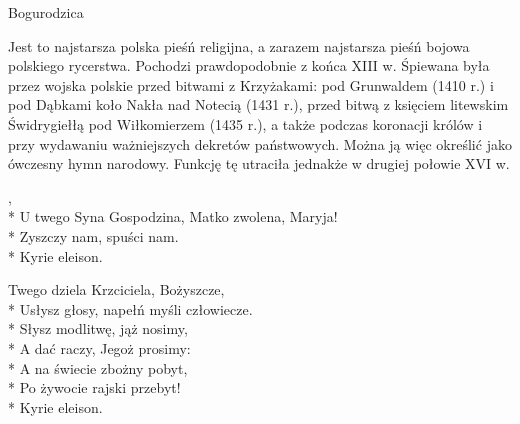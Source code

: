 \song
{Bogurodzica}
\begin{info}Jest to najstarsza polska pieśń religijna, a zarazem najstarsza pieśń bojowa polskiego rycerstwa. Pochodzi prawdopodobnie z końca XIII w. Śpiewana była przez wojska polskie przed bitwami z Krzyżakami: pod Grunwaldem (1410 r.) i pod Dąbkami koło Nakła nad Notecią (1431 r.), przed bitwą z księciem litewskim Świdrygiełłą pod Wiłkomierzem (1435 r.), a także podczas koronacji królów i przy wydawaniu ważniejszych dekretów państwowych. Można ją więc określić jako ówczesny hymn narodowy. Funkcję tę utraciła jednakże w drugiej połowie XVI w.\end{info}

\begin{lyrics}[longestline={U twego Syna Gospodzina, Matko zwolena, Maryja!}]

,\\*
U twego Syna Gospodzina, Matko zwolena, Maryja!\\*
Zyszczy nam, spuści nam.\\*
Kyrie eleison.

Twego dziela Krzciciela, Bożyszcze,\\*
Usłysz głosy, napełń myśli człowiecze.\\*
Słysz modlitwę, jąż nosimy,\\*
A dać raczy, Jegoż prosimy:\\*
A na świecie zbożny pobyt,\\*
Po żywocie rajski przebyt!\\*
Kyrie eleison.
\end{lyrics}




